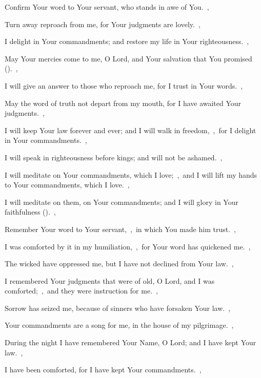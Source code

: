 \documentclass[12pt,twoside,a5paper]{article}
\begin{document}
\begin{normalparskip}
  Confirm Your word to Your servant, who stands in awe of You.~\sep

  Turn away reproach from me, for Your judgments are lovely.~\sep

  I delight in Your commandments; and restore my life in Your righteousness.~\sep

   May Your mercies come to me, O Lord, and Your salvation that You promised ().~\sep


  I will give an answer to those who reproach me, for I trust in Your words.~\sep

  May the word of truth not depart from my mouth, for I have awaited Your judgments.~\sep

  I will keep Your law forever and ever; and I will walk in freedom,~\sep\ for I delight in Your commandments.~\sep

  I will speak in righteousness before kings; and will not be ashamed.~\sep

  I will meditate on Your commandments, which I love;~\sep\ and I will lift my hands to Your commandments, which I love.~\sep

  I will meditate on them, on Your commandments; and I will glory in Your faithfulness ().~\sep

   Remember Your word to Your servant,~\sep\ in which You made him trust.~\sep


  I was comforted by it in my humiliation,~\sep\ for Your word has quickened me.~\sep

  The wicked have oppressed me, but I have not declined from Your law.~\sep

  I remembered Your judgments that were of old, O Lord, and I was comforted;~\sep\ and they were instruction for me.~\sep

  Sorrow has seized me, because of sinners who have forsaken Your law.~\sep

  Your commandments are a song for me, in the house of my pilgrimage.~\sep

  During the night I have remembered Your Name, O Lord; and I have kept Your law.~\sep

  I have been comforted, for I have kept Your commandments.~\sep


\end{normalparskip}
\end{document}
